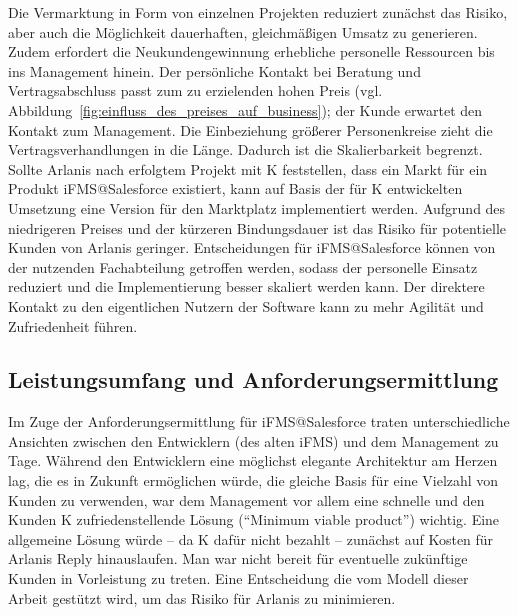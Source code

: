 Die Vermarktung in Form von einzelnen Projekten reduziert zunächst das Risiko, 
aber auch die Möglichkeit dauerhaften, gleichmäßigen Umsatz zu generieren. 
Zudem erfordert die Neukundengewinnung erhebliche personelle Ressourcen bis ins 
Management hinein. Der persönliche Kontakt bei Beratung und Vertragsabschluss 
passt zum zu erzielenden hohen Preis (vgl. 
Abbildung~\ref{fig:einfluss_des_preises_auf_business}); der Kunde erwartet den 
Kontakt zum Management. Die Einbeziehung größerer Personenkreise zieht die 
Vertragsverhandlungen in die Länge. Dadurch ist die Skalierbarkeit begrenzt. 
Sollte Arlanis nach erfolgtem Projekt mit K feststellen, dass ein Markt für ein 
Produkt iFMS@Salesforce existiert, kann auf Basis der für K entwickelten 
Umsetzung eine Version für den Marktplatz implementiert werden. Aufgrund des 
niedrigeren Preises und der kürzeren Bindungsdauer ist das Risiko für 
potentielle Kunden von Arlanis geringer. Entscheidungen für iFMS@Salesforce 
können von der nutzenden Fachabteilung getroffen werden, sodass der personelle 
Einsatz reduziert und die Implementierung besser skaliert werden kann. Der 
direktere Kontakt zu den eigentlichen Nutzern der Software kann zu mehr 
Agilität und Zufriedenheit führen.
\begin{comment}
Durch die Vermarktung als Projekt steigt für den Kunden die Investition und mit 
ihr das Risiko. In Folge werden -- anstatt das Produkt direkt an die 
Fachabteilungen zu vermarkten -- weiterhin in vielen Gremien langwierige 
Verhandlungen um den Leistungsumfang geführt, die in Lasten- und Pflichtenheften 
resultieren. Mit diesem Verlust an Agilität geht auch ein weiterer Verlust an 
Skalierbarkeit einher. Anstatt einem Kunden schnell die Lösung zu liefern und 
Umsätze zu generieren, muss der ISV erheblich in die Verhandlungen investieren, 
ohne das der Vertragsabschluss gesichert wäre.

Während eine personalintensive Wertschöpfung charakteristisch für 
Beratungsunternehmen ist, könnte Arlanis überdenken, ob der direkte Verkauf an 
Fachabteilungen durch Minderung des Risikos für den Kunden durch die 
Realisierung von Cloud-Vorteilen forciert werden könnte. 
\end{comment}

\subsection{Leistungsumfang und Anforderungsermittlung}
Im Zuge der Anforderungsermittlung für iFMS@Salesforce traten 
unterschiedliche Ansichten zwischen den Entwicklern (des alten iFMS) und 
dem Management zu Tage. Während den Entwicklern eine möglichst elegante 
Architektur am Herzen lag, die es in Zukunft ermöglichen würde, die gleiche 
Basis für eine Vielzahl von Kunden zu verwenden, war dem Management vor 
allem eine schnelle und den Kunden K zufriedenstellende Lösung ("`Minimum viable 
product"') wichtig. Eine allgemeine Lösung würde -- da K dafür nicht bezahlt -- 
zunächst auf Kosten für Arlanis Reply hinauslaufen. Man war nicht bereit für 
eventuelle zukünftige Kunden in Vorleistung zu treten. Eine Entscheidung die vom 
Modell dieser Arbeit gestützt wird, um das Risiko für Arlanis zu minimieren.

